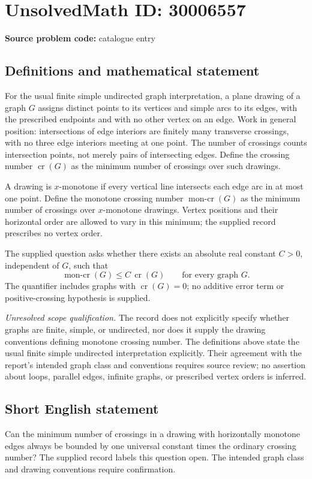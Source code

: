 \documentclass[11pt]{article}
\begin{document}
\section*{UnsolvedMath ID: 30006557}
\textbf{Source problem code:} catalogue entry
\subsection{Definitions and mathematical statement}
For the usual finite simple undirected graph interpretation, a plane drawing of a graph \(G\) assigns distinct points to its vertices and simple arcs to its edges, with the prescribed endpoints and with no other vertex on an edge. Work in general position: intersections of edge interiors are finitely many transverse crossings, with no three edge interiors meeting at one point. The number of crossings counts intersection points, not merely pairs of intersecting edges. Define the crossing number \(\operatorname{cr}(G)\) as the minimum number of crossings over such drawings.

A drawing is \(x\)-monotone if every vertical line intersects each edge arc in at most one point. Define the monotone crossing number \(\operatorname{mon\text{-}cr}(G)\) as the minimum number of crossings over \(x\)-monotone drawings. Vertex positions and their horizontal order are allowed to vary in this minimum; the supplied record prescribes no vertex order.

The supplied question asks whether there exists an absolute real constant \(C>0\), independent of \(G\), such that
\[
\operatorname{mon\text{-}cr}(G)\leq C\,\operatorname{cr}(G)
\qquad\text{for every graph }G.
\]
The quantifier includes graphs with \(\operatorname{cr}(G)=0\); no additive error term or positive-crossing hypothesis is supplied.

\emph{Unresolved scope qualification.} The record does not explicitly specify whether graphs are finite, simple, or undirected, nor does it supply the drawing conventions defining monotone crossing number. The definitions above state the usual finite simple undirected interpretation explicitly. Their agreement with the report's intended graph class and conventions requires source review; no assertion about loops, parallel edges, infinite graphs, or prescribed vertex orders is inferred.
\subsection{Short English statement}
Can the minimum number of crossings in a drawing with horizontally monotone edges always be bounded by one universal constant times the ordinary crossing number? The supplied record labels this question open. The intended graph class and drawing conventions require confirmation.
\end{document}
